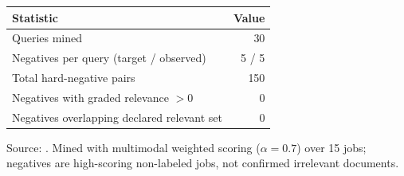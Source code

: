 \caption{Hard-negative mining summary (multimodal top-10 pool, $K{=}5$ negatives per query).}
\label{tab:hard-negs}
\begin{tabular}{@{}lr@{}}
\toprule
Statistic & Value \\
\midrule
Queries mined & 30 \\
Negatives per query (target / observed) & 5 / 5 \\
Total hard-negative pairs & 150 \\
Negatives with graded relevance $>0$ & 0 \\
Negatives overlapping declared relevant set & 0 \\
\bottomrule
\end{tabular}
\par\vspace{0.4em}
\footnotesize{Source: . Mined with multimodal weighted scoring ($\alpha{=}0.7$) over 15 jobs; negatives are high-scoring non-labeled jobs, not confirmed irrelevant documents.}
